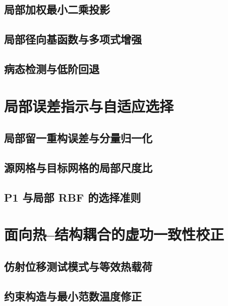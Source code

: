 \subsection{局部加权最小二乘投影}
\thesisdraftnote

\subsection{局部径向基函数与多项式增强}
\thesisdraftnote

\subsection{病态检测与低阶回退}
\thesisdraftnote

\section{局部误差指示与自适应选择}
\subsection{局部留一重构误差与分量归一化}
\thesisdraftnote

\subsection{源网格与目标网格的局部尺度比}
\thesisdraftnote

\subsection{P1 与局部 RBF 的选择准则}
\thesisdraftnote

\section{面向热--结构耦合的虚功一致性校正}
\subsection{仿射位移测试模式与等效热载荷}
\thesisdraftnote

\subsection{约束构造与最小范数温度修正}
\thesisdraftnote

